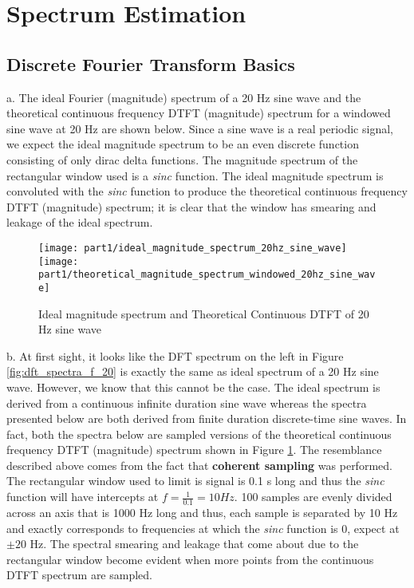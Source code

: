\section{Spectrum Estimation}

\subsection{Discrete Fourier Transform Basics}\label{sec:dft_basics}

\noindent{}a. The ideal Fourier (magnitude) spectrum of a 20 Hz sine wave and the theoretical continuous frequency DTFT (magnitude) spectrum for a windowed sine wave at 20 Hz are shown below. Since a sine wave is a real periodic signal, we expect the ideal magnitude spectrum to be an even discrete function consisting of only dirac delta functions. The magnitude spectrum of the rectangular window used is a \textit{sinc} function. The ideal magnitude spectrum is convoluted with the \textit{sinc} function to produce the theoretical continuous frequency DTFT (magnitude) spectrum; it is clear that the window has smearing and leakage of the ideal spectrum.

\begin{figure}[H]
\centering{}
\texttt{[image: part1/ideal\_magnitude\_spectrum\_20hz\_sine\_wave]}
\texttt{[image: part1/theoretical\_magnitude\_spectrum\_windowed\_20hz\_sine\_wave]}
\label{fig:ideal_and_theoretical_spectra_f_20}
\caption{Ideal magnitude spectrum and Theoretical Continuous DTFT of 20 Hz sine wave}
\end{figure}

\noindent{}b. At first sight, it looks like the DFT spectrum on the left in Figure \ref{fig:dft_spectra_f_20} is exactly the same as ideal spectrum of a 20 Hz sine wave. However, we know that this cannot be the case. The ideal spectrum is derived from a continuous infinite duration sine wave whereas the spectra presented below are both derived from finite duration discrete-time sine waves. In fact, both the spectra below are sampled versions of the theoretical continuous frequency DTFT (magnitude) spectrum shown in Figure \ref{fig:ideal_and_theoretical_spectra_f_20}. The resemblance described above comes from the fact that \textbf{coherent sampling} was performed. The rectangular window used to limit is signal is 0.1 s long and thus the \textit{sinc} function will have intercepts at $f=\frac{1}{0.1}=10 Hz$. 100 samples are evenly divided across an axis that is 1000 Hz long and thus, each sample is separated by 10 Hz and exactly corresponds to frequencies at which the \textit{sinc} function is 0, expect at $\pm 20$ Hz. The spectral smearing and leakage that come about due to the rectangular window become evident when more points from the continuous DTFT spectrum are sampled.

